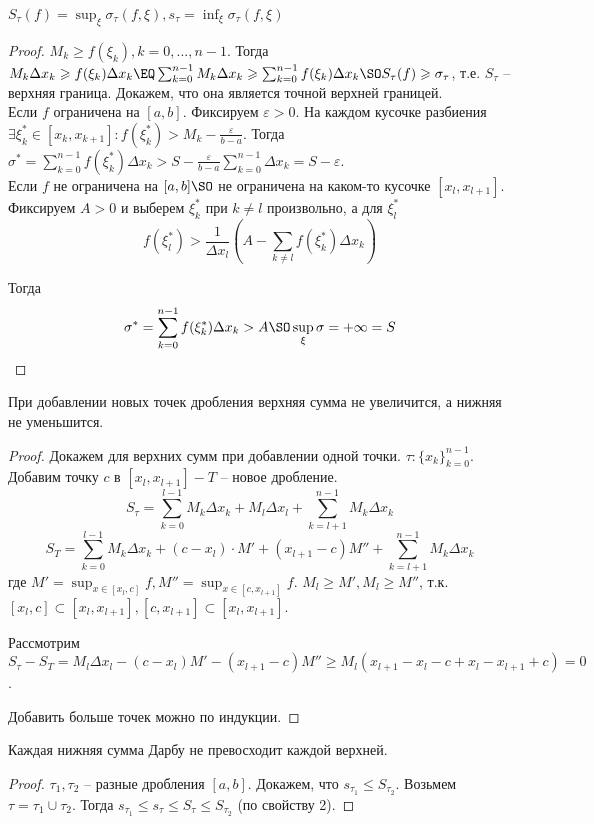 \begin{MyList}
	\item $S_\tau (f) = \displaystyle{\sup_\xi \sigma_\tau (f, \xi)}, s_\tau = \displaystyle{\inf_\xi \sigma_\tau (f, \xi)}$ 
	\begin{proof}
		$M_k \geqslant f(\xi_k), k = 0, ..., n - 1$. Тогда $M_k \Delta x_k \geqslant f(\xi_k) \Delta x_k \EQ \sum_{k = 0}^{n - 1} M_k \Delta x_k \geqslant \sum_{k = 0}^{n - 1} f(\xi_k) \Delta x_k \SO S_\tau (f) \geqslant \sigma_\tau $, т.е. $S_\tau$ -- верхняя граница. Докажем, что она является точной верхней границей. \\
		Если $f$ ограничена на $[a, b]$. Фиксируем $\varepsilon > 0$. На каждом кусочке разбиения $\exists \xi_k^* \in [x_k, x_{k + 1}] : f(\xi_k^*) > M_k - \frac{\varepsilon}{b - a}$.
		Тогда $\sigma^* = \sum_{k = 0}^{n - 1} f(\xi_k^*) \Delta x_k > S - \frac{\varepsilon}{b - a}\sum_{k = 0}^{n - 1} \Delta x_k = S - \varepsilon$. \\
		Если $f$ не ограничена на $[a, b] \SO$ не ограничена на каком-то кусочке $[x_l, x_{l + 1}]$. 
		Фиксируем $A > 0$ и выберем $\xi_k^*$ при $k \neq l$ произвольно, а для $\xi_l^*$
		\[f(\xi_l^*) > \frac{1}{\Delta x_l}\left(A - \displaystyle{\sum_{k \neq l} f(\xi_k^*) \Delta x_k}\right)\]

		Тогда 
		\[\sigma^* = \displaystyle{\sum_{k = 0}^{n - 1} f(\xi_k^*) \Delta x_k} > A \SO \sup_\xi \sigma = +\infty = S\] 
	\end{proof}

	\item При добавлении новых точек дробления верхняя сумма не увеличится, а нижняя не уменьшится.
	\begin{proof}
		Докажем для верхних сумм при добавлении одной точки.
		$\tau : \{x_k\}_{k = 0}^{n - 1}$. Добавим точку $c$ в $[x_l, x_{l + 1}] - T$ -- новое дробление. \\
		\[S_\tau = \sum_{k = 0}^{l - 1} M_k \Delta x_k + M_l \Delta x_l + \sum_{k = l + 1}^{n - 1} M_k \Delta x_k\]
		\[S_T = \sum_{k = 0}^{l - 1} M_k \Delta x_k + (c - x_l) \cdot M' + (x_{l + 1} - c) M'' + \sum_{k = l + 1}^{n - 1} M_k \Delta x_k\]
		где $M' = \sup_{x \in [x_l, c]} f, M'' = \sup_{x \in [c, x_{l + 1}]} f$. $M_l \geqslant M', M_l \geqslant M''$, т.к. $[x_l, c] \subset [x_l, x_{l + 1}], [c, x_{l + 1}] \subset [x_l, x_{l + 1}]$.

		Рассмотрим $S_\tau - S_T = M_l \Delta x_l - (c - x_l) M' - (x_{l + 1} - c) M'' \geqslant M_l (x_{l + 1} - x_l - c + x_l - x_{l + 1} + c) = 0$.
		
		Добавить больше точек можно по индукции.
	\end{proof}

	\item Каждая нижняя сумма Дарбу не превосходит каждой верхней.
	\begin{proof}
		$\tau_1, \tau_2$ -- разные дробления $[a, b]$. Докажем, что $s_{\tau_1} \leqslant S_{\tau_2}$. Возьмем $\tau = \tau_1 \cup \tau_2$. Тогда $s_{\tau_1} \leqslant s_\tau \leqslant S_\tau \leqslant S_{\tau_2}$ (по свойству 2).
	\end{proof}
\end{MyList}

